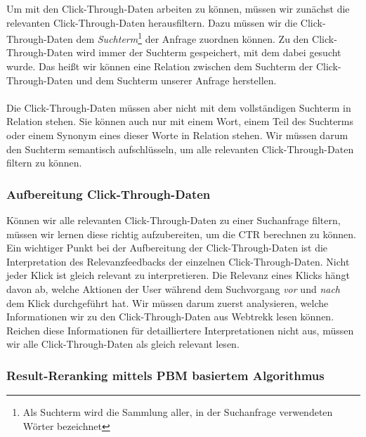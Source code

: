 Um mit den Click-Through-Daten arbeiten zu können, müssen wir zunächst die relevanten Click-Through-Daten herausfiltern. Dazu müssen wir die Click-Through-Daten dem \textit{Suchterm}\footnote{Als Suchterm wird die Sammlung aller, in der Suchanfrage verwendeten Wörter bezeichnet} der Anfrage zuordnen können. Zu den Click-Through-Daten wird immer der Suchterm gespeichert, mit dem dabei gesucht wurde. Das heißt wir können eine Relation zwischen dem Suchterm der Click-Through-Daten und dem Suchterm unserer Anfrage herstellen.
\\
\\
Die Click-Through-Daten müssen aber nicht mit dem vollständigen Suchterm in Relation stehen. Sie können auch nur mit einem Wort, einem Teil des Suchterms oder einem Synonym eines dieser Worte in Relation stehen. Wir müssen darum den Suchterm semantisch aufschlüsseln, um alle relevanten Click-Through-Daten filtern zu können. 

\subsubsection{Aufbereitung Click-Through-Daten}
\label{sec:Einfuehrung:Methodik:Click-Through-Daten}

Können wir alle relevanten Click-Through-Daten zu einer Suchanfrage filtern, müssen wir lernen diese richtig aufzubereiten, um die CTR berechnen zu können.  Ein wichtiger Punkt bei der Aufbereitung der Click-Through-Daten ist die Interpretation des Relevanzfeedbacks der einzelnen Click-Through-Daten. Nicht jeder Klick ist gleich relevant zu interpretieren. Die Relevanz eines Klicks hängt davon ab, welche Aktionen der User während dem Suchvorgang \textit{vor} und \textit{nach} dem Klick durchgeführt hat. Wir müssen darum zuerst analysieren, welche Informationen wir zu den Click-Through-Daten aus Webtrekk lesen können.  Reichen diese Informationen für detailliertere Interpretationen nicht aus, müssen wir alle Click-Through-Daten als gleich relevant lesen.

\subsubsection{Result-Reranking mittels PBM basiertem Algorithmus}
\label{sec:Einfuehrung:Methodik:Result-RerankingPBM}

